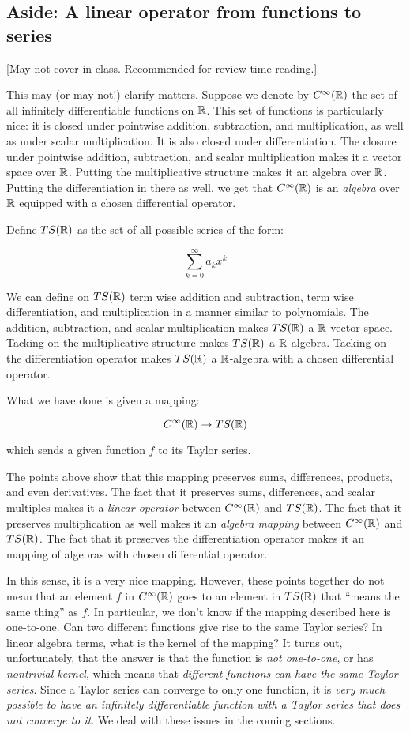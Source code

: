 \documentclass{amsart}
\begin{document}
\subsection*{Aside: A linear operator from functions to series}

[May not cover in class. Recommended for review time reading.]

This may (or may not!) clarify matters. Suppose we denote by
$C^\infty(\mathbb{R})$ the set of all infinitely differentiable functions on
$\mathbb{R}$. This set of functions is particularly nice: it is closed under
pointwise addition, subtraction, and multiplication, as well as under
scalar multiplication. It is also closed under differentiation. The
closure under pointwise addition, subtraction, and scalar
multiplication makes it a vector space over $\mathbb{R}$. Putting the
multiplicative structure makes it an algebra over $\mathbb{R}$. Putting the
differentiation in there as well, we get that $C^\infty(\mathbb{R})$ is an
{\em algebra} over $\mathbb{R}$ equipped with a chosen differential operator.

Define $TS(\mathbb{R})$ as the set of all possible series of the form:

$$\sum_{k=0}^\infty a_kx^k$$

We can define on $TS(\mathbb{R})$ term wise addition and subtraction, term
wise differentiation, and multiplication in a manner similar to
polynomials. The addition, subtraction, and scalar multiplication
makes $TS(\mathbb{R})$ a $\mathbb{R}$-vector space. Tacking on the multiplicative
structure makes $TS(\mathbb{R})$ a $\mathbb{R}$-algebra. Tacking on the
differentiation operator makes $TS(\mathbb{R})$ a $\mathbb{R}$-algebra with a chosen
differential operator.

What we have done is given a mapping:

$$C^\infty(\mathbb{R}) \to TS(\mathbb{R})$$

which sends a given function $f$ to its Taylor series.

The points above show that this mapping preserves sums, differences,
products, and even derivatives. The fact that it preserves sums,
differences, and scalar multiples makes it a {\em linear operator}
between $C^\infty(\mathbb{R})$ and $TS(\mathbb{R})$. The fact that it preserves
multiplication as well makes it an {\em algebra mapping} between
$C^\infty(\mathbb{R})$ and $TS(\mathbb{R})$. The fact that it preserves the
differentiation operator makes it an mapping of algebras with chosen
differential operator.

In this sense, it is a very nice mapping. However, these points
together do not mean that an element $f$ in $C^\infty(\mathbb{R})$ goes to an
element in $TS(\mathbb{R})$ that ``means the same thing'' as $f$. In
particular, we don't know if the mapping described here is
one-to-one. Can two different functions give rise to the same Taylor
series? In linear algebra terms, what is the kernel of the mapping?
It turns out, unfortunately, that the answer is that the function is
{\em not one-to-one}, or has {\em nontrivial kernel}, which means that
{\em different functions can have the same Taylor series}. Since a
Taylor series can converge to only one function, it is {\em very much
possible to have an infinitely differentiable function with a Taylor
series that does not converge to it}. We deal with these issues in the
coming sections.
\end{document}
